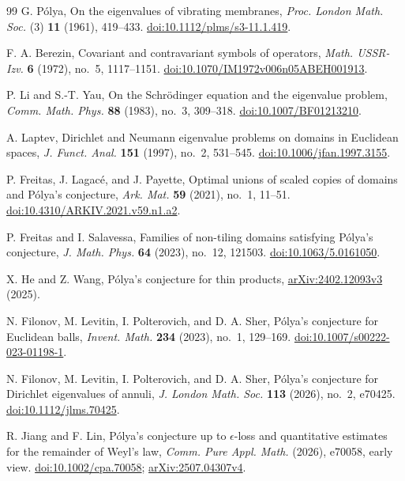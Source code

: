 \documentclass[11pt,reqno]{amsart}
\numberwithin{equation}{section}
\begin{document}
\begin{thebibliography}{99}
G. P\'olya,
On the eigenvalues of vibrating membranes,
\emph{Proc. London Math. Soc.} (3) \textbf{11} (1961), 419--433.
\href{https://doi.org/10.1112/plms/s3-11.1.419}{doi:10.1112/plms/s3-11.1.419}.

F. A. Berezin,
Covariant and contravariant symbols of operators,
\emph{Math. USSR-Izv.} \textbf{6} (1972), no.~5, 1117--1151.
\href{https://doi.org/10.1070/IM1972v006n05ABEH001913}{doi:10.1070/IM1972v006n05ABEH001913}.

P. Li and S.-T. Yau,
On the Schr\"odinger equation and the eigenvalue problem,
\emph{Comm. Math. Phys.} \textbf{88} (1983), no.~3, 309--318.
\href{https://doi.org/10.1007/BF01213210}{doi:10.1007/BF01213210}.

A. Laptev,
Dirichlet and Neumann eigenvalue problems on domains in Euclidean spaces,
\emph{J. Funct. Anal.} \textbf{151} (1997), no.~2, 531--545.
\href{https://doi.org/10.1006/jfan.1997.3155}{doi:10.1006/jfan.1997.3155}.

P. Freitas, J. Lagac\'e, and J. Payette,
Optimal unions of scaled copies of domains and P\'olya's conjecture,
\emph{Ark. Mat.} \textbf{59} (2021), no.~1, 11--51.
\href{https://doi.org/10.4310/ARKIV.2021.v59.n1.a2}{doi:10.4310/ARKIV.2021.v59.n1.a2}.

P. Freitas and I. Salavessa,
Families of non-tiling domains satisfying P\'olya's conjecture,
\emph{J. Math. Phys.} \textbf{64} (2023), no.~12, 121503.
\href{https://doi.org/10.1063/5.0161050}{doi:10.1063/5.0161050}.

X. He and Z. Wang,
P\'olya's conjecture for thin products,
\href{https://arxiv.org/abs/2402.12093v3}{arXiv:2402.12093v3} (2025).

N. Filonov, M. Levitin, I. Polterovich, and D. A. Sher,
P\'olya's conjecture for Euclidean balls,
\emph{Invent. Math.} \textbf{234} (2023), no.~1, 129--169.
\href{https://doi.org/10.1007/s00222-023-01198-1}{doi:10.1007/s00222-023-01198-1}.

N. Filonov, M. Levitin, I. Polterovich, and D. A. Sher,
P\'olya's conjecture for Dirichlet eigenvalues of annuli,
\emph{J. London Math. Soc.} \textbf{113} (2026), no.~2, e70425.
\href{https://doi.org/10.1112/jlms.70425}{doi:10.1112/jlms.70425}.

R. Jiang and F. Lin,
P\'olya's conjecture up to $\epsilon$-loss and quantitative estimates
for the remainder of Weyl's law,
\emph{Comm. Pure Appl. Math.} (2026), e70058, early view.
\href{https://doi.org/10.1002/cpa.70058}{doi:10.1002/cpa.70058};
\href{https://arxiv.org/abs/2507.04307v4}{arXiv:2507.04307v4}.


\end{thebibliography}
\end{document}
